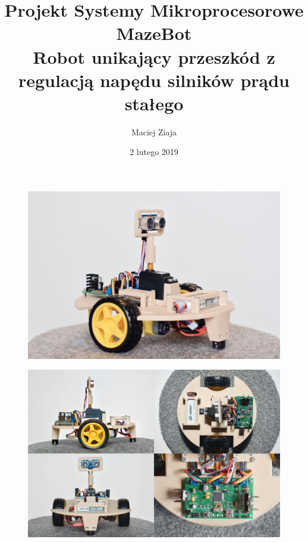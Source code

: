 \documentclass[11pt]{article}
\author{Maciej Ziaja}
\date{2 lutego 2019}
\begin{document}
\title{
	Projekt Systemy Mikroprocesorowe \\
	\large MazeBot \\
	Robot unikający przeszkód z regulacją napędu silników prądu stałego}

\maketitle

\vfill
\begin{figure}[!htbp]
	\centering
	\includegraphics[width=\linewidth]{"Title Page Photo"}
\end{figure}
\vfill

\begin{figure}
	\centering
	\includegraphics[width=\linewidth]{"Overview Collage"}
\end{figure}
\end{document}
